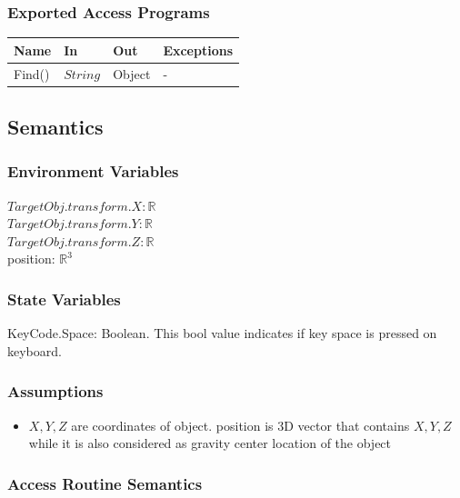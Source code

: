 \documentclass[12pt, titlepage]{article}
\begin{document}
\subsubsection{Exported Access Programs}

\begin{center}
	\begin{tabular}{p{2cm} p{4cm} p{4cm} p{2cm}}
		\hline
		\textbf{Name} & \textbf{In} & \textbf{Out} & \textbf{Exceptions} \\
		\hline
		Find() & $String$ & Object & - \\
		\hline		
	\end{tabular}
\end{center}

\subsection{Semantics}

\subsubsection{Environment Variables}
$TargetObj.transform.X: \mathbb{R}$\\
$TargetObj.transform.Y: \mathbb{R}$\\
$TargetObj.transform.Z: \mathbb{R}$\\
position: $\mathbb{R}^{3}$
\subsubsection{State Variables}

KeyCode.Space: Boolean.
This bool value indicates if key space is pressed on keyboard.

\subsubsection{Assumptions}

\noindent
\begin{itemize}
	\item $X,Y,Z$ are coordinates of object. position is 3D vector that contains $X,Y,Z$ while it is also considered as gravity center location of the object
\end{itemize}

\subsubsection{Access Routine Semantics}
\end{document}
